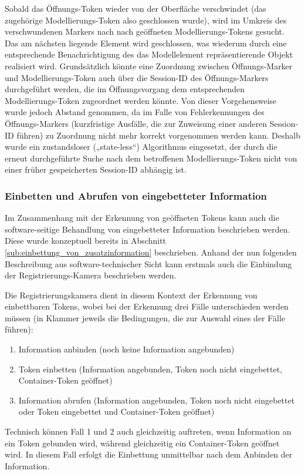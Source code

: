 Sobald das Öffnungs-Token wieder von der Oberfläche verschwindet (das zugehörige Modellierungs-Token also geschlossen wurde), wird im Umkreis des verschwundenen Markers nach nach geöffneten Modellierungs-Tokens gesucht. Das am nächsten liegende Element wird geschlossen, was wiederum durch eine entsprechende Benachrichtigung des das Modellelement repräsentierende Objekt realisiert wird. Grundsätzlich könnte eine Zuordnung zwischen Öffnungs-Marker und Modellierungs-Token auch über die Session-ID des Öffnungs-Markers durchgeführt werden, die im Öffnungsvorgang dem entsprechenden Modellierungs-Token zugeordnet werden könnte. Von dieser Vorgehensweise wurde jedoch Abstand genommen, da im Falle von Fehlerkennungen des Öffnungs-Markers (kurzfristige Ausfälle, die zur Zuweisung einer anderen Session-ID führen) zu Zuordnung nicht mehr korrekt vorgenommen werden kann. Deshalb wurde ein zustandsloser („state-less“) Algorithmus eingesetzt, der durch die erneut durchgeführte Suche nach dem betroffenen Modellierungs-Token nicht von einer früher gespeicherten Session-ID abhängig ist.

\subsubsection{Einbetten und Abrufen von eingebetteter Information} %
\label{ssub:einbetten_und_abrufen_von_eingebetteter_information}

Im Zusammenhang mit der Erkennung von geöffneten Tokens kann auch die software-seitige Behandlung von eingebetteter Information beschrieben werden. Diese wurde konzeptuell bereits in Abschnitt \ref{sub:einbettung_von_zusatzinformation} beschrieben. Anhand der nun folgenden Beschreibung aus software-technischer Sicht kann erstmals auch die Einbindung der Registrierungs-Kamera beschrieben werden.

Die Registrierungskamera dient in diesem Kontext der Erkennung von einbettbaren Tokens, wobei bei der Erkennung drei Fälle unterschieden werden müssen (in Klammer jeweils die Bedingungen, die zur Auswahl eines der Fälle führen):
\begin{enumerate}
	\item Information anbinden (noch keine Information angebunden)
	\item Token einbetten (Information angebunden, Token noch nicht eingebettet, Container-Token geöffnet)
	\item Information abrufen (Information angebunden, Token noch nicht eingebettet oder Token eingebettet und Container-Token geöffnet)
\end{enumerate}
Technisch können Fall 1 und 2 auch gleichzeitig auftreten, wenn Information an ein Token gebunden wird, während gleichzeitig ein Container-Token geöffnet wird. In diesem Fall erfolgt die Einbettung unmittelbar nach dem Anbinden der Information.

